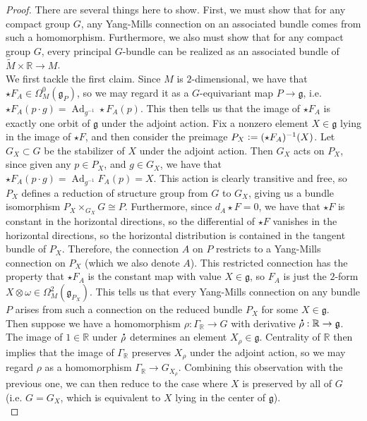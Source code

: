 \documentclass[psamsfonts, 12pt]{amsart}
\theoremstyle{definition}
\theoremstyle{remark}
\newcommand{\R}{\mathbb{R}}
\newcommand{\g}{\mathfrak{g}}
\newcommand*{\dt}[1]{%
   \accentset{\mbox{\large\bfseries .}}{#1}}
\newcommand{\inv}{^{-1}}
\newcommand{\defeq}{\vcentcolon=}
\DeclareMathOperator{\Ad}{Ad}
\begin{document}
\begin{proof}
There are several things here to show. First, we must show that for any compact
group $G$, any Yang-Mills connection on an associated bundle comes from such a
homomorphism. Furthermore, we also must show that for any compact
group $G$, every principal $G$-bundle can be realized as an associated bundle
of $\widetilde{M} \times \R \to M$. \\

We first tackle the first claim. Since $M$ is $2$-dimensional, we have that
$\star F_A \in \Omega^0_M(\g_P)$, so we may regard it as a $G$-equivariant map
$P \to \g$, i.e. $\star F_A(p\cdot g) = \Ad_{g\inv}\star F_A(p)$. This then
tells us that the image of $\star F_A$ is exactly one orbit of $\g$ under the adjoint
action.  Fix a nonzero element $X \in \g$ lying in the image of $\star F$, and then
consider the preimage $P_X \defeq (\star F_A)\inv(X)$. Let $G_X \subset G$ be the
stabilizer of $X$ under the adjoint action. Then $G_X$ acts on $P_X$, since given any
$p \in P_X$, and $g \in G_X$, we have that $\star F_A(p\cdot g) = \Ad_{g\inv} F_A(p) = X$.
This action is clearly transitive and free, so $P_X$ defines a reduction of structure
group from $G$ to $G_X$, giving us a bundle isomorphism $P_X \times_{G_X} G \cong P$.
Furthermore, since $d_A \star F = 0$, we have that $\star F$ is constant in
the horizontal directions, so the differential of $\star F$ vanishes in the horizontal
directions, so the horizontal distribution is contained in the tangent bundle
of $P_X$. Therefore, the connection $A$ on $P$ restricts to a Yang-Mills connection on
$P_X$ (which we also denote $A$). This restricted connection has the property
that $\star F_A$ is the constant map with value $X \in \g$, so $F_A$ is
just the $2$-form $X \otimes \omega \in \Omega^2_M(\g_{P_X})$. This tells us that
every Yang-Mills connection on any bundle $P$ arises from such a connection on
the reduced bundle $P_X$ for some $X \in \g$. \\

Then suppose we have a homomorphism $\rho : \Gamma_\R \to G$ with derivative
$\dt{\rho} : \R \to \g$. The image of $1 \in \R$ under $\dt{\rho}$ determines an
element $X_\rho \in \g$. Centrality of $\R$ then implies that
the image of $\Gamma_\R$ preserves $X_\rho$ under the adjoint action, so we may
regard $\rho$ as a homomorphism $\Gamma_\R \to G_{X_\rho}$. Combining this observation
with the previous one, we can then reduce to the case where $X$ is preserved
by all of $G$ (i.e. $G = G_X$, which is equivalent to $X$ lying in the center of $\g$). \\


\end{proof}
\end{document}
